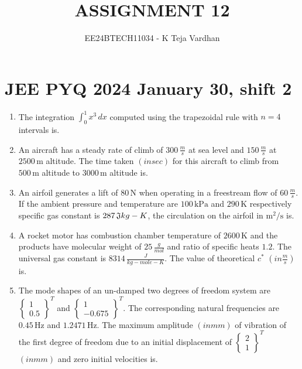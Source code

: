 \documentclass[journal]{IEEEtran}
\newcommand{\brak}[1]{\left( #1 \right)}
\begin{document}

\title{ASSIGNMENT 12}
\author{EE24BTECH11034 - K Teja Vardhan}
{\let\newpage\relax\maketitle}

\section{JEE PYQ 2024 January 30, shift 2}
\begin{enumerate}

    \item The integration $ \int_0^1 x^3 \, dx $ computed using the trapezoidal rule with $ n = 4 $ intervals is.
    
    \item An aircraft has a steady rate of climb of $300 \, \frac{m}{s}$ at sea level and $150 \, \frac{m}{s}$ at $2500 \, \text{m}$ altitude. The time taken $\brak{in sec}$ for this aircraft to climb from $500 \, \text{m}$ altitude to $3000 \, \text{m}$ altitude is.
    
    \item An airfoil generates a lift of $80 \, \text{N}$ when operating in a freestream flow of $60 \, \frac{m}{s}$. If the ambient pressure and temperature are $100 \, \text{kPa}$ and $290 \, \text{K}$ respectively specific gas constant is $287 \, \frak{J}{kg-K}$, the circulation on the airfoil in $ \text{m}^2/\text{s} $ is.
    
    \item A rocket motor has combustion chamber temperature of $2600 \, \text{K}$ and the products have molecular weight of $25 \, \frac{g}{mol}$ and ratio of specific heats $1.2$. The universal gas constant is $8314 \, \frac{J}{kg-mole-K}$. The value of theoretical $ c^* $ $\brak{in \frac{m}{s}}$ is.
    
    \item The mode shapes of an un-damped two degrees of freedom system are $ \begin{Bmatrix} 1 \\ 0.5 \end{Bmatrix}^T $ and $ \begin{Bmatrix} 1 \\ -0.675 \end{Bmatrix}^T $. The corresponding natural frequencies are $0.45 \, \text{Hz}$ and $1.2471 \, \text{Hz}$. The maximum amplitude $\brak{in mm}$ of vibration of the first degree of freedom due to an initial displacement of $ \begin{Bmatrix} 2 \\ 1 \end{Bmatrix}^T $ $\brak{in mm}$ and zero initial velocities is.
    

\end{enumerate}
\end{document}
